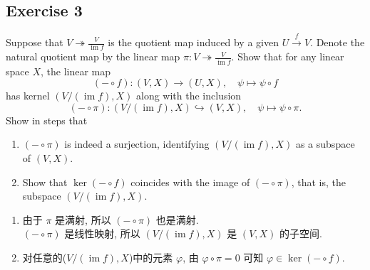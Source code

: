 \documentclass[11pt]{ctexart}
\theoremstyle{definition}
\numberwithin{equation}{section}
\theoremstyle{definition}
\theoremstyle{remark}
\begin{document}
\subsection{Exercise 3}
Suppose that $V \twoheadrightarrow \frac{V}{\operatorname {im} f}$ is the quotient map induced by a given $U \xrightarrow f V$. Denote the natural quotient map by the linear map $\pi :V \twoheadrightarrow \frac{V}{\operatorname {im} f}$. Show that for any linear space $X$, the linear map
$$
(-\circ f): (V,X) \to (U, X), \quad  \psi \mapsto \psi \circ f
$$
has kernel $(V/ (\operatorname {im} f),X)$ along with the inclusion
$$
(- \circ \pi ): (V / (\operatorname {im}f), X) \hookrightarrow (V, X), \quad  \psi \mapsto \psi \circ \pi.
$$
Show in steps that\
\begin{enumerate}
    \item $(- \circ \pi)$ is indeed a surjection, identifying $(V / (\operatorname {im}f), X) $ as a subspace of $(V,X)$.
    \item Show that $\ker (- \circ f)$ coincides with the image of $(- \circ \pi)$, that is, the subspace $(V/ (\operatorname {im} f),X)$.
\end{enumerate}
\begin{aaa}
    \begin{enumerate}
        \item 由于 $\pi$ 是满射, 所以 $(-\circ \pi)$ 也是满射.\\$(-\circ \pi)$ 是线性映射, 所以 $(V/ (\operatorname {im} f),X)$ 是 $(V,X)$ 的子空间.
        \item 对任意的($V/ (\operatorname {im} f),X$)中的元素 $\varphi$, 由 $\varphi\circ \pi=0$ 可知 $\varphi \in \ker (-\circ f)$.
    \end{enumerate}
\end{aaa}
\end{document}
